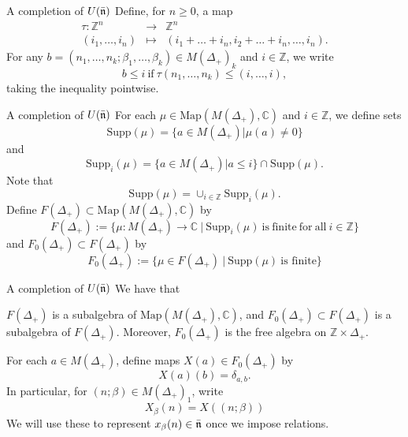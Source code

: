\documentclass{beamer}
\begin{document}
\begin{frame}{A completion of $U(\bar{\frak{n}})$}
  Define, for $n \ge 0$, a map
\begin{eqnarray} \label{tau}
\tau: \mathbb{Z}^n & \longrightarrow & \mathbb{Z}^n \\ \nonumber
(i_1,\dots,i_n) & \mapsto & (i_1+\dots+i_n, i_2+\dots+i_n,\dots,i_n). \nonumber
\end{eqnarray}
\pause
For any $b = (n_1,\dots, n_k; \beta_1 , \dots ,\beta_k) \in M(\Delta_+)_k$
and $i \in \mathbb{Z}$, we write
$$
b \le i \ \mbox{if} \ \tau(n_1,\dots,n_k) \le (i,\dots,i),
$$
taking the inequality pointwise.\\


\end{frame}


\begin{frame}{A completion of $U(\bar{\frak{n}})$}
  For
each $\mu \in \mbox{Map}(M(\Delta_+),\mathbb{C})$ and $i \in \mathbb{Z}$, we define sets
$$
\mbox{Supp}(\mu) = \{a \in M(\Delta_+) | \mu(a) \neq 0 \}
$$
\pause
and
$$ \mbox{Supp}_i(\mu) = \{ a \in M(\Delta_+) | a \le i \} \cap
\mbox{Supp}(\mu).
$$
Note that
$$
\mathrm{Supp}(\mu) = \cup_{i \in \mathbb{Z}} \mbox{Supp}_i(\mu).
$$
\pause
Define $F(\Delta_+) \subset \mbox{Map}(M(\Delta_+),\mathbb{C})$ by
$$
F(\Delta_+) := \{ \mu:M(\Delta_+) \longrightarrow \mathbb{C} \  | \  \mathrm{Supp}_i(\mu)\  \mathrm{is \ finite \ 
for\  all\  } i \in \mathbb{Z} \}
$$
and $F_0(\Delta_+) \subset F(\Delta_+)$ by
$$
F_0(\Delta_+) := \{ \mu \in F(\Delta_+) \  | \  \mbox{Supp}(\mu) \ \mbox{is finite} \}
$$
\end{frame}


\begin{frame}{A completion of $U(\bar{\frak{n}})$}
 We have that
\begin{theorem} 
 $F(\Delta_+)$ is a subalgebra of $\mbox{Map}(M(\Delta_+),\mathbb{C})$, and $F_0(\Delta_+) \subset F(\Delta_+)$ is a 
 subalgebra of $F(\Delta_+)$. Moreover,  $F_0(\Delta_+)$ is the free algebra on $\mathbb{Z} \times \Delta_+$.
\end{theorem}
\pause
 For each $a \in M(\Delta_+)$, define maps $X(a) \in F_0(\Delta_+)$ by
$$
X(a)(b) = \delta_{a,b}.
$$
In particular, for $(n;\beta) \in M(\Delta_+)_1$, write 
$$
X_\beta(n) = X((n;\beta))
$$
We will use these to represent $x_\beta(n) \in \bar{\frak{n}}$ once we impose relations.

\end{frame}
\end{document}
